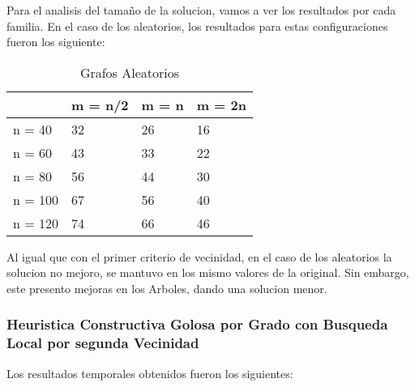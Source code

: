 \newpage
Para el analisis del tamaño de la solucion, vamos a ver los resultados por cada familia. En el caso de los aleatorios, los resultados para estas configuraciones fueron los siguiente:

\begin{table}[]
\centering
\caption{Grafos Aleatorios}
\label{my-label}
\begin{tabular}{|l|lll|}
\hline
        & \multicolumn{1}{l|}{m = n/2} & \multicolumn{1}{l|}{m = n} & m = 2n \\ \hline
n = 40  & 32                           & 26                         & 16     \\ \cline{1-1}
n = 60  & 43                           & 33                         & 22     \\ \cline{1-1}
n = 80  & 56                           & 44                         & 30     \\ \cline{1-1}
n = 100 & 67                           & 56                         & 40     \\ \cline{1-1}
n = 120 & 74                           & 66                         & 46     \\ \hline
\end{tabular}
\end{table}

Al igual que con el primer criterio de vecinidad, en el caso de los aleatorios la solucion no mejoro, se mantuvo en los mismo valores de la original. Sin embargo, este presento mejoras en los Arboles, dando una solucion menor.

\subsubsection{Heuristica Constructiva Golosa por Grado con Busqueda Local por segunda Vecinidad}

Los resultados temporales obtenidos fueron los siguientes:

